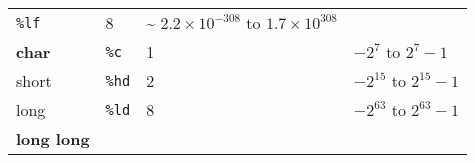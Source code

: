 \documentclass[
]{article}
\begin{document}
\begin{longtable}[]{@{}llll@{}}
\begin{minipage}[t]{0.13\columnwidth}
\texttt{\%lf}\strut
\end{minipage} & \begin{minipage}[t]{0.19\columnwidth}\raggedright
8\strut
\end{minipage} & \begin{minipage}[t]{0.43\columnwidth}\raggedright
\textasciitilde{} \(2.2 \times 10^{-308}\) to
\(1.7 \times 10^{308}\)\strut
\end{minipage}\tabularnewline
\begin{minipage}[t]{0.14\columnwidth}\raggedright
\textbf{char}\strut
\end{minipage} & \begin{minipage}[t]{0.13\columnwidth}\raggedright
\texttt{\%c}\strut
\end{minipage} & \begin{minipage}[t]{0.19\columnwidth}\raggedright
1\strut
\end{minipage} & \begin{minipage}[t]{0.43\columnwidth}\raggedright
\(-2^{7}\) to \(2^{7}-1\)\strut
\end{minipage}\tabularnewline
\begin{minipage}[t]{0.14\columnwidth}\raggedright
short\strut
\end{minipage} & \begin{minipage}[t]{0.13\columnwidth}\raggedright
\texttt{\%hd}\strut
\end{minipage} & \begin{minipage}[t]{0.19\columnwidth}\raggedright
2\strut
\end{minipage} & \begin{minipage}[t]{0.43\columnwidth}\raggedright
\(-2^{15}\) to \(2^{15}-1\)\strut
\end{minipage}\tabularnewline
\begin{minipage}[t]{0.14\columnwidth}\raggedright
long\strut
\end{minipage} & \begin{minipage}[t]{0.13\columnwidth}\raggedright
\texttt{\%ld}\strut
\end{minipage} & \begin{minipage}[t]{0.19\columnwidth}\raggedright
8\strut
\end{minipage} & \begin{minipage}[t]{0.43\columnwidth}\raggedright
\(-2^{63}\) to \(2^{63}-1\)\strut
\end{minipage}\tabularnewline
\begin{minipage}[t]{0.14\columnwidth}\raggedright
\textbf{long long}\strut

\end{minipage}
\end{longtable}
\end{document}
